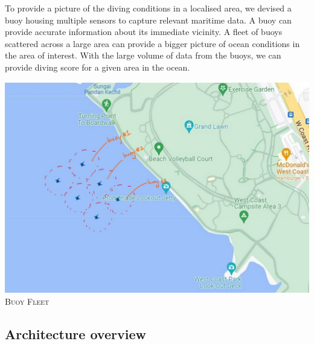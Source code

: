 \documentclass{article}
\begin{document}
\begin{multicols}{2}
    To provide a picture of the diving conditions in a localised area, we devised a buoy housing multiple sensors to capture relevant maritime data. A buoy can provide accurate information about its immediate vicinity. A fleet of buoys scattered across a large area can provide a bigger picture of ocean conditions in the area of interest. With the large volume of data from the buoys, we can provide diving score for a given area in the ocean.
    \begin{center}
        \includegraphics[width=\columnwidth]{report/images/buoy-fleet.jpg}
        \textsc{Buoy Fleet}
    \end{center}
\end{multicols}

\newpage
\subsection{Architecture overview}
\end{document}
